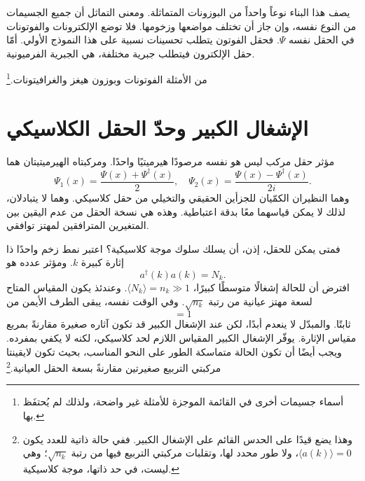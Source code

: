 يصف هذا البناء نوعاً واحداً من البوزونات المتماثلة. ومعنى التماثل أن جميع الجسيمات من النوع نفسه، وإن جاز أن تختلف مواضعها وزخومها. فلا توضع الإلكترونات والفوتونات في الحقل نفسه \(\Psi\). فحقل الفوتون يتطلب تحسينات نسبية على هذا النموذج الأولي. أمّا حقل الإلكترون فيتطلب جبرية مختلفة، هي الجبرية الفرميونية.

\begin{classroomqa}
\end{classroomqa}


من الأمثلة الفوتونات وبوزون هيغز والغرافيتونات.\footnote{أسماء جسيمات أخرى في القائمة الموجزة للأمثلة غير واضحة، ولذلك لم يُحتفَظ بها.}

\section{الإشغال الكبير وحدّ الحقل الكلاسيكي}

مؤثر حقل مركب ليس هو نفسه مرصودًا هيرميتيًا واحدًا. ومركبتاه الهيرميتيتان هما
\begin{equation}
\Psi_1(x)=\frac{\Psi(x)+\Psi^\dagger(x)}{2},
\quad
\Psi_2(x)=\frac{\Psi(x)-\Psi^\dagger(x)}{2i}.
\end{equation}
وهما النظيران الكمّيان للجزأين الحقيقي والتخيلي من حقل كلاسيكي. وهما لا يتبادلان، لذلك لا يمكن قياسهما معًا بدقة اعتباطية. وهذه هي نسخة الحقل من عدم اليقين بين المتغيرين المترافقين لمهتز توافقي.

فمتى يمكن للحقل، إذن، أن يسلك سلوك موجة كلاسيكية؟ اعتبر نمط زخم واحدًا ذا إثارة كبيرة \(k\). ومؤثر عدده هو
\begin{equation}
a^\dagger(k)a(k)=N_k.
\end{equation}
افترض أن للحالة إشغالًا متوسطًا كبيرًا، \(\langle N_k\rangle=n_k\gg 1\). وعندئذ يكون المقياس المتاح لسعة مهتز عيانية من رتبة \(\sqrt{n_k}\). وفي الوقت نفسه، يبقى الطرف الأيمن من
\begin{equation}
[a(k),a^\dagger(k)]=1
\end{equation}
ثابتًا. والمبدّل لا ينعدم أبدًا، لكن عند الإشغال الكبير قد تكون آثاره صغيرة مقارنةً بمربع مقياس الإثارة. يوفّر الإشغال الكبير المقياس اللازم لحد كلاسيكي، لكنه لا يكفي بمفرده. ويجب أيضًا أن تكون الحالة متماسكة الطور على النحو المناسب، بحيث تكون لايقينتا مركبتي التربيع صغيرتين مقارنةً بسعة الحقل العيانية.\footnote{وهذا يضع قيدًا على الحدس القائم على الإشغال الكبير. ففي حالة ذاتية للعدد يكون \(\langle a(k)\rangle=0\)، ولا طور محدد لها، وتقلبات مركبتي التربيع فيها من رتبة \(\sqrt{n_k}\)؛ وهي ليست، في حد ذاتها، موجة كلاسيكية.}

